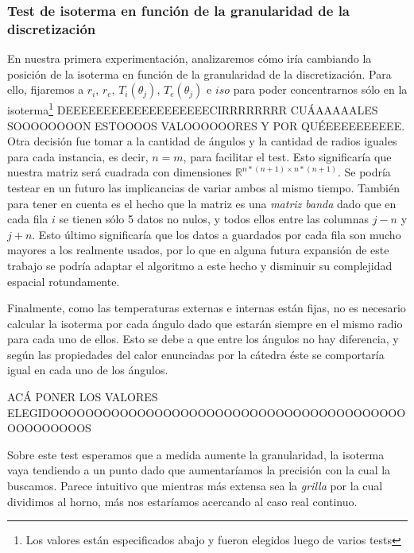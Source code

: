 \subsubsection{Test de isoterma en función de la granularidad de la discretización}

En nuestra primera experimentación, analizaremos cómo iría cambiando la posición de la isoterma en
función de la granularidad de la discretización. Para ello, fijaremos a $r_i$, $r_e$,
$T_i(\theta_j)$, $T_e(\theta_j)$ e $iso$ para poder concentrarnos sólo en la isoterma\footnote{Los
  valores están especificados abajo y fueron elegidos luego de varios tests}
  DEEEEEEEEEEEEEEEEEEECIRRRRRRRR CUÁAAAAALES SOOOOOOOON ESTOOOOS VALOOOOOORES Y POR QUÉEEEEEEEEEE.
Otra decisión fue tomar a la cantidad de ángulos y la cantidad de radios iguales para cada
instancia, es decir, $n=m$, para facilitar el test.  Esto significaría que nuestra matriz será
cuadrada con dimensiones $\mathbb{R}^{n*(n+1) \times n*(n+1)}$. Se podría testear en un futuro las
implicancias de variar ambos al mismo tiempo. También para tener en cuenta es el hecho que la matriz
es una \textit{matriz banda} dado que en cada fila $i$ se tienen sólo 5 datos no nulos, y todos
ellos entre las columnas $j-n$ y $j+n$. Esto último significaría que los datos a guardados por cada
fila son mucho mayores a los realmente usados, por lo que en alguna futura expansión de este trabajo
se podría adaptar el algoritmo a este hecho y disminuir su complejidad espacial rotundamente.

Finalmente, como las temperaturas externas e internas están fijas, no es necesario calcular la
isoterma por cada ángulo dado que estarán siempre en el mismo radio para cada uno de ellos. Esto se
debe a que entre los ángulos no hay diferencia, y según las propiedades del calor enunciadas por la
cátedra éste se comportaría igual en cada uno de los ángulos.


ACÁ PONER LOS VALORES ELEGIDOOOOOOOOOOOOOOOOOOOOOOOOOOOOOOOOOOOOOOOOOOOOOOOOOOS


Sobre este test esperamos que a medida aumente la granularidad, la isoterma vaya tendiendo a un
punto dado que aumentaríamos la precisión con la cual la buscamos. Parece intuitivo que mientras más
extensa sea la \textit{grilla} por la cual dividimos al horno, más nos estaríamos acercando al caso
real continuo.
